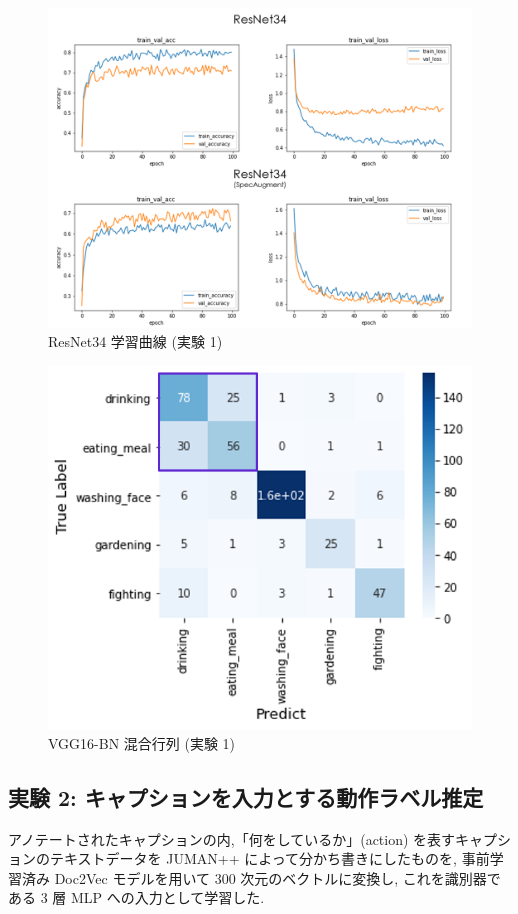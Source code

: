 \documentclass[twocolumn]{jarticle}     %
\begin{document}
\begin{figure}[!tbh]
  \centering
  \includegraphics[scale=0.45]{resnet34_ex1.png}
  \caption{ResNet34 学習曲線 (実験 1)}
  \label{fig:resnet34_ex1}
\end{figure}

\begin{figure}[!tbh]
  \centering
  \includegraphics[scale=0.5]{ex1_cm_vgg.png}
  \caption{VGG16-BN 混合行列 (実験 1)}
  \label{fig:ex1_cm_vgg}
\end{figure}

\subsection{\small{実験 2: キャプションを入力とする動作ラベル推定}}
アノテートされたキャプションの内,「何をしているか」(action) を表すキャプションのテキストデータを JUMAN++ \cite{130007854954} によって分かち書きにしたものを, 事前学習済み Doc2Vec モデルを用いて 300 次元のベクトルに変換し, これを識別器である 3 層 MLP への入力として学習した.
\end{document}
